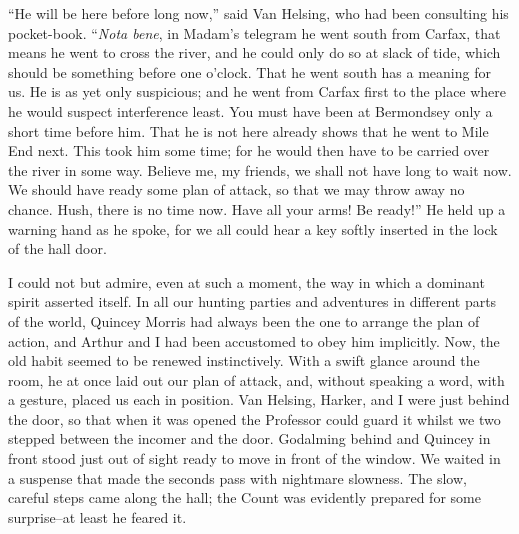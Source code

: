 \documentclass[12pt,openright]{book}
\begin{document}
“He will be here before long now,” said Van Helsing, who had been consulting his pocket-book. “\textit{Nota bene}, in Madam’s telegram he went south from Carfax, that means he went to cross the river, and he could only do so at slack of tide, which should be something before one o’clock. That he went south has a meaning for us. He is as yet only suspicious; and he went from Carfax first to the place where he would suspect interference least. You must have been at Bermondsey only a short time before him. That he is not here already shows that he went to Mile End next. This took him some time; for he would then have to be carried over the river in some way. Believe me, my friends, we shall not have long to wait now. We should have ready some plan of attack, so that we may throw away no chance. Hush, there is no time now. Have all your arms! Be ready!” He held up a warning hand as he spoke, for we all could hear a key softly inserted in the lock of the hall door.

I could not but admire, even at such a moment, the way in which a dominant spirit asserted itself. In all our hunting parties and adventures in different parts of the world, Quincey Morris had always been the one to arrange the plan of action, and Arthur and I had been accustomed to obey him implicitly. Now, the old habit seemed to be renewed instinctively. With a swift glance around the room, he at once laid out our plan of attack, and, without speaking a word, with a gesture, placed us each in position. Van Helsing, Harker, and I were just behind the door, so that when it was opened the Professor could guard it whilst we two stepped between the incomer and the door. Godalming behind and Quincey in front stood just out of sight ready to move in front of the window. We waited in a suspense that made the seconds pass with nightmare slowness. The slow, careful steps came along the hall; the Count was evidently prepared for some surprise–at least he feared it.
\end{document}
